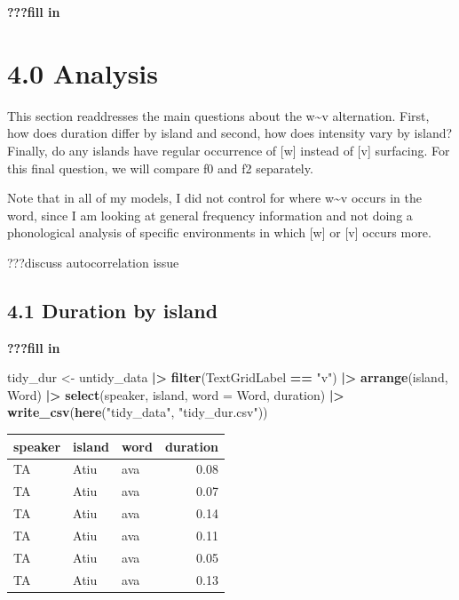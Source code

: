 \documentclass[
  ,man,floatsintext]{apa6}
\newenvironment{Shaded}{\begin{snugshade}}{\end{snugshade}}
\newcommand{\AttributeTok}[1]{\textcolor[rgb]{0.13,0.29,0.53}{#1}}
\newcommand{\FunctionTok}[1]{\textcolor[rgb]{0.13,0.29,0.53}{\textbf{#1}}}
\newcommand{\NormalTok}[1]{#1}
\newcommand{\OtherTok}[1]{\textcolor[rgb]{0.56,0.35,0.01}{#1}}
\newcommand{\SpecialCharTok}[1]{\textcolor[rgb]{0.81,0.36,0.00}{\textbf{#1}}}
\newcommand{\StringTok}[1]{\textcolor[rgb]{0.31,0.60,0.02}{#1}}
\begin{document}
\textbf{???fill in}

\section{4.0 Analysis}\label{analysis}

This section readdresses the main questions about the w\textasciitilde v alternation. First, how does duration differ by island and second, how does intensity vary by island? Finally, do any islands have regular occurrence of {[}w{]} instead of {[}v{]} surfacing. For this final question, we will compare f0 and f2 separately.

Note that in all of my models, I did not control for where w\textasciitilde v occurs in the word, since I am looking at general frequency information and not doing a phonological analysis of specific environments in which {[}w{]} or {[}v{]} occurs more.

???discuss autocorrelation issue

\subsection{4.1 Duration by island}\label{duration-by-island}

\textbf{???fill in}

\begin{Shaded}
\begin{Highlighting}[]
\NormalTok{tidy\_dur }\OtherTok{\textless{}{-}}\NormalTok{ untidy\_data }\SpecialCharTok{|\textgreater{}}
  \FunctionTok{filter}\NormalTok{(TextGridLabel }\SpecialCharTok{==} \StringTok{"v"}\NormalTok{) }\SpecialCharTok{|\textgreater{}}  
  \FunctionTok{arrange}\NormalTok{(island, Word) }\SpecialCharTok{|\textgreater{}}  
  \FunctionTok{select}\NormalTok{(speaker, island, }\AttributeTok{word =}\NormalTok{ Word, duration) }\SpecialCharTok{|\textgreater{}}
  \FunctionTok{write\_csv}\NormalTok{(}\FunctionTok{here}\NormalTok{(}\StringTok{"tidy\_data"}\NormalTok{, }\StringTok{"tidy\_dur.csv"}\NormalTok{))}
\end{Highlighting}
\end{Shaded}

\begin{tabular}{l|l|l|r}
\hline
speaker & island & word & duration\\
\hline
TA & Atiu & ava & 0.08\\
\hline
TA & Atiu & ava & 0.07\\
\hline
TA & Atiu & ava & 0.14\\
\hline
TA & Atiu & ava & 0.11\\
\hline
TA & Atiu & ava & 0.05\\
\hline
TA & Atiu & ava & 0.13\\
\hline
\end{tabular}
\end{document}
